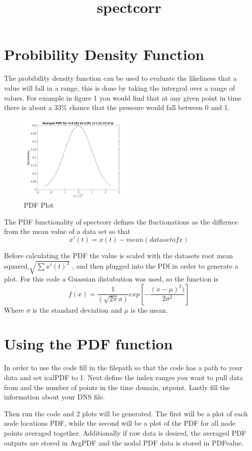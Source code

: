 \documentclass[12pt, oneside]{article}
\title{spectcorr}
\author{}
\begin{document}
\section{Probibility Density Function}

The probibility density function can be used to evaluate the likeliness that a value will fall in a range, this is done by taking the 
intergral over a range of values. For example in figure 1 you would find that at any given point in time there is about a 33\% chance that the pressure would fall between
0 and 1.

\begin{figure}[H]
\centering
\includegraphics[width=0.5\textwidth]{FIGS/PDF_Plot.jpg}

\caption{{\footnotesize PDF Plot}}
\label{fig: } 
\end{figure}

The PDF functionality of spectcorr defines the fluctionations as the differnce from the mean value of a data set so that
\[x'(t)=x(t)-mean(dataset of x)\]

Before calculating the PDF the value is scaled with the datasets root mean squared,$\sqrt{\sum x'(t)^2}$ , and then plugged into the PDf in order to generate a plot.
For this code a Guassian distubution was used, so the function is \[f(x)= \dfrac{1}{(\sqrt{2\pi}\sigma)}exp[-\dfrac{(x-\mu)^2)}{2\sigma^2}]\]
Where \(\sigma\) is the standard deviation and \(\mu\) is the mean.

\section{Using the PDF function}


In order to use the code fill in the filepath so that the code has a path to your data and set icalPDF to 1.
Next define the index ranges you want to pull data from and the number of points in the time domain, ntpoint. 
Lastly fill the information about your DNS file.

Then run the code and 2 plots will be generated. The first will be a plot of each node locations PDF, while the second will be a plot of the PDF for all node points averaged together.
Additionally if raw data is desired, the averaged PDF outputs are stored in AvgPDF and the nodal PDF data is stored in PDFvalue.
\end{document}
